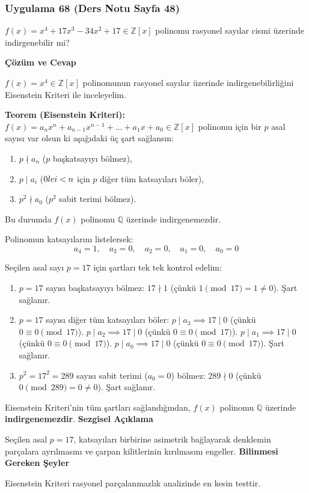 \documentclass[11pt, a4paper]{article}
\newenvironment{cozum}{
    \vspace{0.5cm}
    \noindent\textcolor{green!60!black}{\faCheckCircle\enspace \textbf{\Large Çözüm ve Cevap}}\par\vspace{0.2cm}
}{}
\newenvironment{sezgisel}{
    \vspace{0.5cm}
    \noindent\textcolor{orange!80!black}{\faLightbulb\enspace \textbf{\Large Sezgisel Açıklama}}\par\vspace{0.2cm}
    \itshape
}{}
\newenvironment{bilgi}{
    \vspace{0.5cm}
    \noindent\textcolor{red!70!black}{\faExclamationTriangle\enspace \textbf{\Large Bilinmesi Gereken Şeyler}}\par\vspace{0.2cm}
}{}
\begin{document}
\newpage
\subsubsection{Uygulama 68 (Ders Notu Sayfa 48)}
\begin{sorubox}
$f(x) = x^4 + 17x^3 - 34x^2 + 17 \in \mathbb{Z}[x]$ polinomu rasyonel sayılar cismi üzerinde indirgenebilir mi?
\end{sorubox}
\begin{cozum}
$f(x) = x^{4} \in \mathbb{Z}[x]$ polinomunun rasyonel sayılar üzerinde indirgenebilirliğini Eisenstein Kriteri ile inceleyelim.

\textbf{Teorem (Eisenstein Kriteri):} $f(x) = a_n x^n + a_{n-1} x^{n-1} + \dots + a_1 x + a_0 \in \mathbb{Z}[x]$ polinomu için bir $p$ asal sayısı var olsun ki aşağıdaki üç şart sağlansın:
\begin{enumerate}
    \item $p \nmid a_n$ ($p$ başkatsayıyı bölmez),
    \item $p \mid a_i$ ($0 \\le i < n$ için $p$ diğer tüm katsayıları böler),
    \item $p^2 \nmid a_0$ ($p^2$ sabit terimi bölmez).
\end{enumerate}
Bu durumda $f(x)$ polinomu $\mathbb{Q}$ üzerinde indirgenemezdir.

Polinomun katsayılarını listelersek:
\[ a_{4} = 1, \quad a_{3} = 0, \quad a_{2} = 0, \quad a_{1} = 0, \quad a_{0} = 0 \]

Seçilen asal sayı $p = 17$ için şartları tek tek kontrol edelim:
\begin{enumerate}
    \item $p = 17$ sayısı başkatsayıyı bölmez: $17 \nmid 1$ (çünkü $1 \pmod{17} = 1 \neq 0$). Şart sağlanır.
    \item $p = 17$ sayısı diğer tüm katsayıları böler:
    $p \mid a_{3} \implies 17 \mid 0$ (çünkü $0 \equiv 0 \pmod{17}$).
    $p \mid a_{2} \implies 17 \mid 0$ (çünkü $0 \equiv 0 \pmod{17}$).
    $p \mid a_{1} \implies 17 \mid 0$ (çünkü $0 \equiv 0 \pmod{17}$).
    $p \mid a_{0} \implies 17 \mid 0$ (çünkü $0 \equiv 0 \pmod{17}$).
    Şart sağlanır.
    \item $p^2 = 17^2 = 289$ sayısı sabit terimi ($a_0 = 0$) bölmez: $289 \nmid 0$ (çünkü $0 \pmod{289} = 0 \neq 0$). Şart sağlanır.
\end{enumerate}

Eisenstein Kriteri'nin tüm şartları sağlandığından, $f(x)$ polinomu $\mathbb{Q}$ üzerinde \textbf{indirgenemezdir}.
\end{cozum}
\begin{sezgisel}
Seçilen asal $p=17$, katsayıları birbirine asimetrik bağlayarak denklemin parçalara ayrılmasını ve çarpan kilitlerinin kırılmasını engeller.
\end{sezgisel}
\begin{bilgi}
Eisenstein Kriteri rasyonel parçalanmazlık analizinde en kesin testtir.
\end{bilgi}
\end{document}
